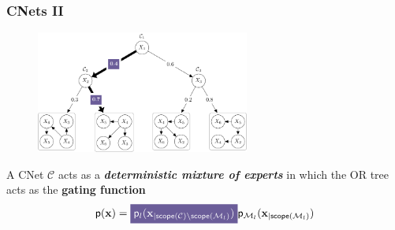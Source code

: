 \documentclass[xcolor={usenames,dvipsnames,svgnames}, compress]{beamer}
\newcommand{\highlight}[2][yellow]{\mathchoice%
  {\colorbox{#1}{\strut\textcolor{white}{$\displaystyle{#2}$}}}%
  {\colorbox{#1}{\strut\textcolor{white}{$\textstyle{#2}$}}}%
  {\colorbox{#1}{\strut\textcolor{white}{$\scriptstyle{#2}$}}}%
  {\colorbox{#1}{\strut\textcolor{white}{$\scriptscriptstyle{#2}$}}}}%
\begin{document}
  \begin{frame}[t]
  \frametitle{CNets II}
  \small
  \begin{figure}
     \centering
     \includegraphics[width=7cm]{figures/csn-II}
  \label{fig:csn}
\end{figure}
  A CNet $\mathcal{C}$ acts as a \emph{\textbf{deterministic mixture of experts}} in
  which the OR tree acts as the \textbf{gating function}
  \begin{equation*}
\mathsf{p}(\mathbf{x}) = \highlight[lacamlilac]{\mathsf{p}_l(\mathbf
x_{|\mathsf{scope}(\mathcal C)\setminus \mathsf{scope}(\mathcal
  M_l)})}\mathsf{p}_{\mathcal M_l}(\mathbf x_{| \mathsf{scope}(\mathcal
  M_l)})\label{eq:cnetdistr}
\end{equation*}
    
\end{frame}
\end{document}
